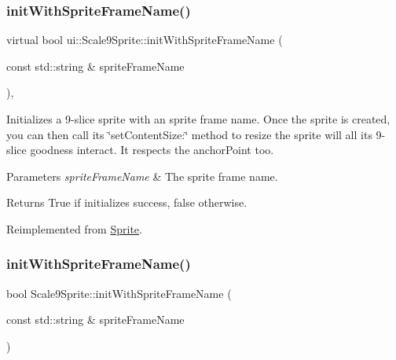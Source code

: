 \subsubsection{\texorpdfstring{init\+With\+Sprite\+Frame\+Name()}{initWithSpriteFrameName()}\hspace{0.1cm}{\footnotesize\ttfamily [3/4]}}
{\footnotesize\ttfamily virtual bool ui\+::\+Scale9\+Sprite\+::init\+With\+Sprite\+Frame\+Name (\begin{DoxyParamCaption}\item[{const std\+::string \&}]{sprite\+Frame\+Name }\end{DoxyParamCaption})\hspace{0.3cm}{\ttfamily [override]}, {\ttfamily [virtual]}}

Initializes a 9-\/slice sprite with an sprite frame name. Once the sprite is created, you can then call its \char`\"{}set\+Content\+Size\+:\char`\"{} method to resize the sprite will all it\textquotesingle{}s 9-\/slice goodness interact. It respects the anchor\+Point too.


\begin{DoxyParams}{Parameters}
{\em sprite\+Frame\+Name} & The sprite frame name. \\
\hline
\end{DoxyParams}
\begin{DoxyReturn}{Returns}
True if initializes success, false otherwise. 
\end{DoxyReturn}


Reimplemented from \hyperlink{classSprite_ab30fa40d8c557779a21a2a941c3f18ea}{Sprite}.

\mbox{\label{classui_1_1Scale9Sprite_ac28a73f9652a1bffc597085b06087dda}} 
\subsubsection{\texorpdfstring{init\+With\+Sprite\+Frame\+Name()}{initWithSpriteFrameName()}\hspace{0.1cm}{\footnotesize\ttfamily [4/4]}}
{\footnotesize\ttfamily bool Scale9\+Sprite\+::init\+With\+Sprite\+Frame\+Name (\begin{DoxyParamCaption}\item[{const std\+::string \&}]{sprite\+Frame\+Name }\end{DoxyParamCaption})\hspace{0.3cm}{\ttfamily [virtual]}}

